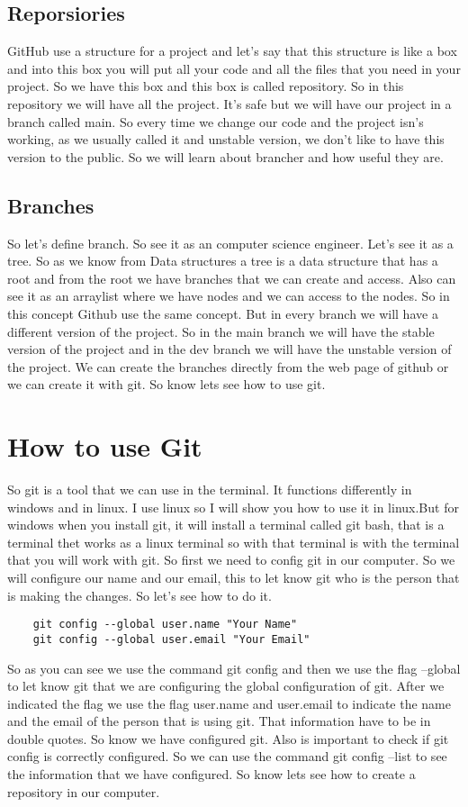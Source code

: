 \documentclass{article}
\begin{document}
\subsection*{Reporsiories}
GitHub use a structure for a project and let's say that this structure is 
like a box and into this box you will put all your code and all the files that you need in your project. 
So we have this box and this box is called repository. So in this repository we will have all the project. It's safe 
but we will have our project in a branch called main. So every time we change our code and the project isn's working, as we
usually called it and unstable version, we don't like to have this version to the public. So we will learn about brancher and
how useful they are.

\subsection*{Branches}
So let's define branch. So see it as an computer science engineer. Let's see it as a tree. So as we know from Data structures
a tree is a data structure that has a root and from the root we have branches that we can create and access. Also can see it as 
an arraylist where we have nodes and we can access to the nodes. So in this concept Github use the same concept. But in every branch 
we will have a different version of the project. So in the main branch we will have the stable version of the project and in the dev branch
we will have the unstable version of the project. We can create the branches directly from the web page of github or we can create it with git. 
So know lets see how to use git.

\section*{How to use Git}
So git is a tool that we can use in the terminal. It functions differently in windows and in linux. I use linux so I will show you how to use it 
in linux.But for windows when you install git, it will install a terminal called git bash, that is a terminal thet works as a linux terminal so 
with that terminal is with the terminal that you will work with git. So first we need to config git in our computer. So we will configure our 
name and our email, this to let know git who is the person that is making the changes. So let's see how to do it. 
\begin{lstlisting}
    git config --global user.name "Your Name"
    git config --global user.email "Your Email"
\end{lstlisting}
So as you can see we use the command git config and then we use the flag --global to let know git that we are configuring 
the global configuration of git. After we indicated the flag we use the flag user.name and user.email to indicate the name 
and the email of the person that is using git. That information have to be in double quotes. So know we have configured git.
Also is important to check if git config is correctly configured. So we can use the command git config --list to see the information
that we have configured. So know lets see how to create a repository in our computer. 
\end{document}
